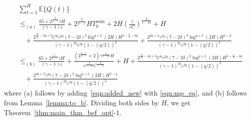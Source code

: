 \documentclass[12pt,draftcls, onecolumn]{IEEEtran}
\begin{document}
\begin{align}\label{eqn:before_main_thm}
&\sum_{t=1}^{H} \mathbb{E}\{Q(t)\} \nonumber\\&\leq_{(a)} \frac{65\times 2^{\frac{2}{p-1}}\gamma H}{(\gamma-1) \varepsilon}+2^{\frac{2}{p-1}}HT_b^{\text{sum}}+ 2H\left(\frac{\gamma}{\varepsilon C}\right)^{\frac{2}{1-2\delta}}+H \nonumber\\&\ \ \ \ +\frac{2^{\frac{5q}{2}-\delta q+3}C^q\gamma^{2q}(7-2\delta)^q \log^{q+2}(2H)H^{2-\frac{q}{2}-\delta q}}{(\gamma-1)^{2q}\varepsilon^{2q}(1-(q/2))^2} +\frac{2^{2q+3}\gamma^{2q}(7-2\delta)^q \log^{q+2}(2H)H^{2-q}}{(\gamma-1)^{2q}\varepsilon^{2q}(1-(q/2))^2} \nonumber\\&\leq_{(b)} \frac{65\times 2^{\frac{2}{p-1}}\gamma H}{(\gamma-1) \varepsilon}+\frac{\left(2^{\frac{p+1}{p-1}}+2\right)\gamma^{\frac{2}{1-2\delta}}H}{\varepsilon^{\frac{2}{1-2\delta}}C^{\frac{2}{1-2\delta}}}+H +\frac{2^{\frac{5q}{2}-\delta q+3}C^q\gamma^{2q}(7-2\delta)^q \log^{q+2}(2H)H^{2-\frac{q}{2}-\delta q}}{(\gamma-1)^{2q}\varepsilon^{2q}(1-(q/2))^2} \nonumber\\&\ \ \ \ +\frac{2^{2q+3}\gamma^{2q}(7-2\delta)^q \log^{q+2}(2H)H^{2-q}}{(\gamma-1)^{2q}\varepsilon^{2q}(1-(q/2))^2} 
\end{align}
where (a) follows by adding~\eqref{eqn:added_new} with \eqref{eqn:mp_eq}, and (b) follows from Lemma~\ref{lemma:to_b}. Dividing both sides by $H$, we get Theorem~\ref{thm:main_thm_bef_opt}-1.
\end{document}
